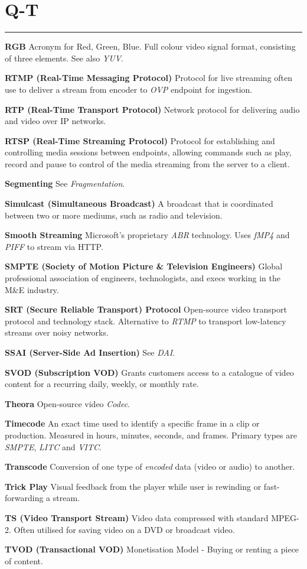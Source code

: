\section{Q-T}
\hrule

\medskip
\textbf{RGB}
Acronym for Red, Green, Blue. Full colour video signal format, consisting of three elements. See also \textit{YUV}.

\smallskip
\textbf{RTMP (Real-Time Messaging Protocol)}
Protocol for live streaming often use to deliver a stream from encoder to \textit{OVP} endpoint for ingestion.

\smallskip
\textbf{RTP (Real-Time Transport Protocol)}
Network protocol for delivering audio and video over IP networks.

\smallskip
\textbf{RTSP (Real-Time Streaming Protocol)}
Protocol for establishing and controlling media sessions between endpoints, allowing commands such as play, record and pause to control of the media streaming from the server to a client.

\smallskip
\textbf{Segmenting}
See \textit{Fragmentation}.

\smallskip
\textbf{Simulcast (Simultaneous Broadcast)}
A broadcast that is coordinated between two or more mediums, such as radio and television.

\smallskip
\textbf{Smooth Streaming}
Microsoft’s proprietary \textit{ABR} technology. Uses \textit{fMP4} and \textit{PIFF} to stream via HTTP.

\smallskip
\textbf{SMPTE (Society of Motion Picture \& Television Engineers)}
Global professional association of engineers, technologists, and execs working in the M\&E industry.

\smallskip
\textbf{SRT (Secure Reliable Transport) Protocol}
Open-source video transport protocol and technology stack. Alternative to \textit{RTMP} to transport low-latency streams over noisy networks.

\smallskip
\textbf{SSAI (Server-Side Ad Insertion)}
See \textit{DAI}.

\smallskip
\textbf{SVOD (Subscription VOD)}
Grants customers access to a catalogue of video content for a recurring daily, weekly, or monthly rate.

\smallskip
\textbf{Theora}
Open-source video \textit{Codec}.

\smallskip
\textbf{Timecode}
An exact time used to identify a specific frame in a clip or production. Measured in hours, minutes, seconds, and frames. Primary types are \textit{SMPTE}, \textit{LITC} and \textit{VITC}.

\smallskip
\textbf{Transcode}
Conversion of one type of \textit{encoded} data (video or audio) to another.

\smallskip
\textbf{Trick Play}
Visual feedback from the player while user is rewinding or fast-forwarding a stream.

\smallskip
\textbf{TS (Video Transport Stream)}
Video data compressed with standard MPEG-2. Often utilised for saving video on a DVD or broadcast video.

\smallskip
\textbf{TVOD (Transactional VOD)}
Monetisation Model - Buying or renting a piece of content.
